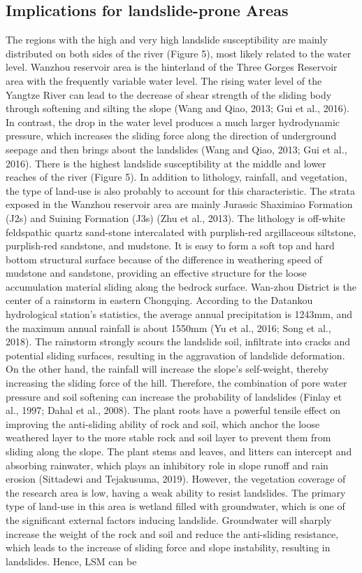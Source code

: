 \documentclass[a4paper,fleqn]{cas-sc}
\begin{document}
\subsection{Implications for landslide-prone Areas}

The regions with the high and very high landslide susceptibility are mainly distributed on both sides of the river (Figure 5), most likely related to the water level. Wanzhou reservoir area is the hinterland of the Three Gorges Reservoir area with the frequently variable water level. The rising water level of the Yangtze River can lead to the decrease of shear strength of the sliding body through softening and silting the slope (Wang and Qiao, 2013; Gui et al., 2016). In contrast, the drop in the water level produces a much larger hydrodynamic pressure, which increases the sliding force along the direction of underground seepage and then brings about the landslides (Wang and Qiao, 2013; Gui et al., 2016). There is the highest landslide susceptibility at the middle and lower reaches of the river (Figure 5). In addition to lithology, rainfall, and vegetation, the type of land-use is also probably to account for this characteristic. The strata exposed in the Wanzhou reservoir area are mainly Jurassic Shaximiao Formation (J2s) and Suining Formation (J3s) (Zhu et al., 2013). The lithology is off-white feldspathic quartz sand-stone intercalated with purplish-red argillaceous siltstone, purplish-red sandstone, and mudstone. It is easy to form a soft top and hard bottom structural surface because of the difference in weathering speed of mudstone and sandstone, providing an effective structure for the loose accumulation material sliding along the bedrock surface. Wan-zhou District is the center of a rainstorm in eastern Chongqing. According to the Datankou hydrological station's statistics, the average annual precipitation is 1243mm, and the maximum annual rainfall is about 1550mm (Yu et al., 2016; Song et al., 2018). The rainstorm strongly scours the landslide soil, infiltrate into cracks and potential sliding surfaces, resulting in the aggravation of landslide deformation. On the other hand, the rainfall will increase the slope's self-weight, thereby increasing the sliding force of the hill. Therefore, the combination of pore water pressure and soil softening can increase the probability of landslides (Finlay et al., 1997; Dahal et al., 2008). The plant roots have a powerful tensile effect on improving the anti-sliding ability of rock and soil, which anchor the loose weathered layer to the more stable rock and soil layer to prevent them from sliding along the slope. The plant stems and leaves, and litters can intercept and absorbing rainwater, which plays an inhibitory role in slope runoff and rain erosion (Sittadewi and Tejakusuma, 2019). However, the vegetation coverage of the research area is low, having a weak ability to resist landslides. The primary type of land-use in this area is wetland filled with groundwater, which is one of the significant external factors inducing landslide. Groundwater will sharply increase the weight of the rock and soil and reduce the anti-sliding resistance, which leads to the increase of sliding force and slope instability, resulting in landslides. Hence, LSM can be 
\end{document}

